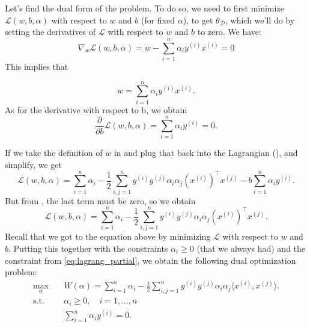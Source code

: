 Let's find the dual form of the problem. To do so, we need to first
minimize $\mathcal L(w,b,\alpha)$ with respect to $w$ and $b$ (for fixed $\alpha$), to get $\theta_{\mathcal D}$, which
we'll do by setting the derivatives of $\mathcal L$ with respect to $w$ and $b$ to zero. We
have:
\begin{equation*}
\nabla_w \mathcal L(w,b,\alpha) = w - \sum_{i=1}^n \alpha_i y^{(i)} x^{(i)} = 0
\end{equation*}
This implies that

\begin{equation}
    w = \sum_{i=1}^n \alpha_i y^{(i)} x^{(i)}.\label{eq:w_alpha_dual}
\end{equation}
As for the derivative with respect to b, we obtain
\begin{equation}
    \frac{\partial}{\partial b} \mathcal L(w,b,\alpha) = \sum_{i=1}^n \alpha_i y^{(i)} = 0.\label{eq:lagrang_partial}
\end{equation}

If we take the definition of $w$ in  and plug that back into
the Lagrangian (), and simplify, we get
\begin{equation}
    \mathcal L(w,b,\alpha) = \sum_{i=1}^n \alpha_i - \frac{1}{2} \sum_{i,j=1}^n y^{(i)} y^{(j)} \alpha_i \alpha_j (x^{(i)} )^\top x^{(j)} - b \sum_{i=1}^n \alpha_i y^{(i)}.
\end{equation}
But from , the last term must be zero, so we obtain
\begin{equation*}
    \mathcal L(w,b,\alpha) = \sum_{i=1}^n \alpha_i - \frac{1}{2} \sum_{i,j=1}^n y^{(i)} y^{(j)} \alpha_i \alpha_j (x^{(i)} )^\top x^{(j)}.    
\end{equation*}
Recall that we got to the equation above by minimizing $\mathcal L$ with respect to $w$
and $b$. Putting this together with the constraints $\alpha_i \ge 0$ (that we always had)
and the constraint from \cref{eq:lagrang_partial}, we obtain the following dual optimization problem:
\begin{align}
    \max_{\alpha} \quad& W(\alpha) = \sum_{i=1}^n \alpha_i - \frac{1}{2} \sum_{i,j=1}^n y^{(i)} y^{(j)} \alpha_i \alpha_j \langle x^{(i)} ,x^{(j)} \rangle.\label{eq:opt_problem_dual}\\
    \operatorname{s.t.} \quad& \alpha_i \ge 0, \quad i = 1,\ldots ,n\\
    \quad& \sum_{i=1}^n \alpha_i y^{(i)} = 0. %
\end{align}

